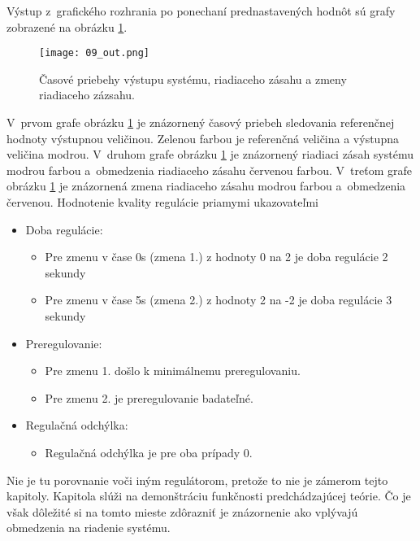 Výstup z~grafického rozhrania po ponechaní prednastavených hodnôt sú grafy zobrazené na obrázku  \ref{09_out}.

\begin{figure}[h]
\centering
\texttt{[image: 09\_out.png]}
\caption{Časové priebehy výstupu systému, riadiaceho zásahu a zmeny riadiaceho zázsahu.}
\label{09_out}
\end{figure}


V~prvom grafe obrázku  \ref{09_out} je znázornený časový priebeh sledovania referenčnej hodnoty výstupnou veličinou. Zelenou farbou je referenčná veličina a výstupna veličina modrou.
V~druhom grafe obrázku  \ref{09_out} je znázornený
riadiaci zásah systému modrou farbou a~obmedzenia riadiaceho zásahu červenou farbou. V~treťom grafe obrázku  \ref{09_out} je znázornená zmena riadiaceho zásahu modrou farbou
a~obmedzenia červenou. Hodnotenie kvality regulácie priamymi ukazovateľmi \cite{MPC06}

\begin{itemize}
  \item Doba regulácie:
    \begin{itemize}
  		\item
    	Pre zmenu v čase 0s (zmena 1.) z hodnoty 0 na 2 je doba regulácie 2 sekundy
    	\item
    	Pre zmenu v čase 5s (zmena 2.) z hodnoty 2 na -2 je doba regulácie 3 sekundy
	\end{itemize}
  \item Preregulovanie:
    \begin{itemize}
  		\item
    	Pre zmenu 1. došlo k minimálnemu preregulovaniu.
    	\item
    	Pre zmenu 2. je preregulovanie badateľné.
	\end{itemize}  
  \item Regulačná odchýlka:
    \begin{itemize}
  		\item
    	Regulačná odchýlka je pre oba prípady 0.
	\end{itemize}   
\end{itemize}

Nie je tu porovnanie voči iným regulátorom, pretože to nie je zámerom tejto kapitoly. Kapitola slúži na demonštráciu funkčnosti predchádzajúcej teórie. Čo je však dôležité si na tomto mieste zdôrazniť je znázornenie ako vplývajú obmedzenia na riadenie systému. 

